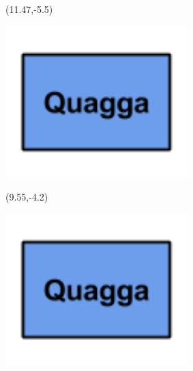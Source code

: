 \documentclass{beamer}
\begin{document}
\begin{frame}
\pause

\begin{textblock}{3}(11.47,-5.5)
\begin{minipage}{\textwidth}
\setlength{\parindent}{0pt}
\setlength{\parskip}{0.1cm}
\includegraphics[width=0.53\textwidth, right]{imagenes/buildingblockquagga.png}
\end{minipage}
\end{textblock}

\begin{textblock}{3}(9.55,-4.2)
\begin{minipage}{\textwidth}
\setlength{\parindent}{0pt}
\setlength{\parskip}{0.1cm}
\includegraphics[width=0.53\textwidth, right]{imagenes/buildingblockquagga.png}
\end{minipage}
\end{textblock}

\end{frame}
\end{document}
